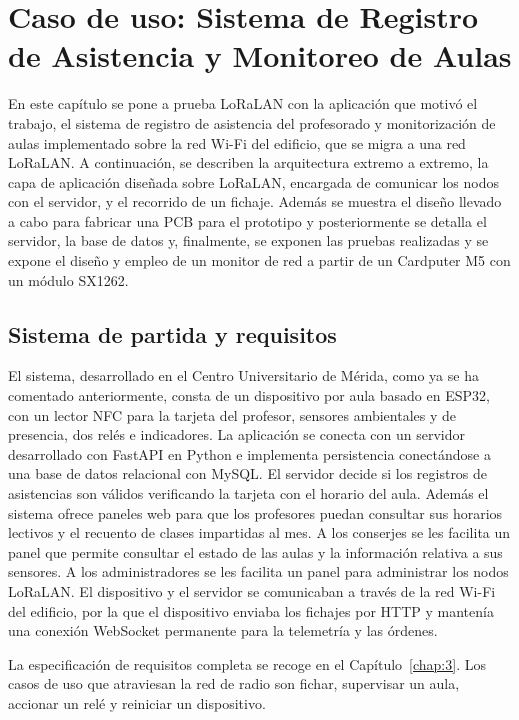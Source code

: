 \chapter{Caso de uso: Sistema de Registro de Asistencia y Monitoreo de Aulas}\label{chap:7}

En este capítulo se pone a prueba LoRaLAN con la aplicación que motivó el trabajo, el sistema de registro de asistencia del profesorado y monitorización de aulas implementado sobre la red Wi-Fi del edificio, que se migra a una red LoRaLAN. A continuación, se describen la arquitectura extremo a extremo, la capa de aplicación diseñada sobre LoRaLAN, encargada de comunicar los nodos con el servidor, y el recorrido de un fichaje. Además se muestra el diseño llevado a cabo para fabricar una PCB para el prototipo y posteriormente se detalla el servidor, la base de datos y, finalmente, se exponen las pruebas realizadas y se expone el diseño y empleo de un monitor de red a partir de un Cardputer M5 con un módulo SX1262.

\section{Sistema de partida y requisitos}

El sistema, desarrollado en el Centro Universitario de Mérida, como ya se ha comentado anteriormente, consta de un dispositivo por aula basado en ESP32, con un lector NFC para la tarjeta del profesor, sensores ambientales y de presencia, dos relés e indicadores. La aplicación se conecta con un servidor desarrollado con FastAPI en Python e implementa persistencia conectándose a una base de datos relacional con MySQL. El servidor decide si los registros de asistencias son válidos verificando la tarjeta con el horario del aula. Además el sistema ofrece paneles web para que los profesores puedan consultar sus horarios lectivos y el recuento de clases impartidas al mes. A los conserjes se les facilita un panel que permite consultar el estado de las aulas y la información relativa a sus sensores. A los administradores se les facilita un panel para administrar los nodos LoRaLAN. El dispositivo y el servidor se comunicaban a través de la red Wi-Fi del edificio, por la que el dispositivo enviaba los fichajes por HTTP y mantenía una conexión WebSocket permanente para la telemetría y las órdenes. 

La especificación de requisitos completa se recoge en el Capítulo~\ref{chap:3}. Los casos de uso que atraviesan la red de radio son fichar, supervisar un aula, accionar un relé y reiniciar un dispositivo.

